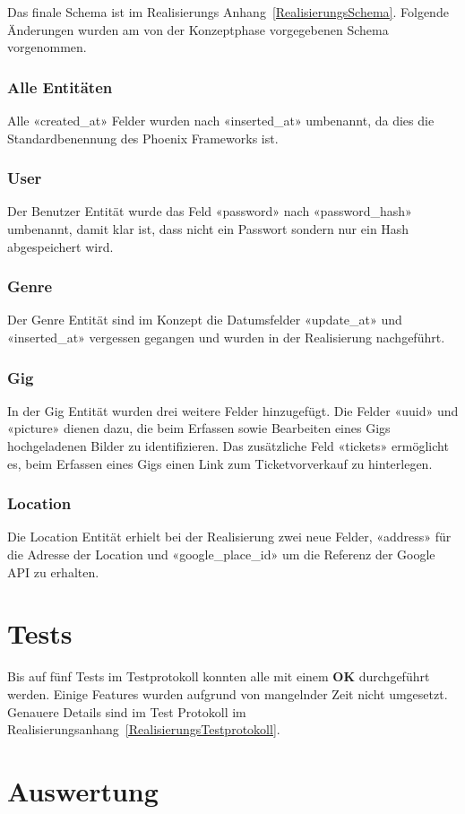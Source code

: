 Das finale Schema ist im Realisierungs Anhang~\ref{RealisierungsSchema}.
Folgende Änderungen wurden am von der Konzeptphase vorgegebenen Schema vorgenommen.

\subsubsection{Alle Entitäten}
Alle «created\_at» Felder wurden nach «inserted\_at» umbenannt, da dies die
Standardbenennung des Phoenix Frameworks ist.

\subsubsection{User}
Der Benutzer Entität wurde das Feld «password» nach «password\_hash» umbenannt,
damit klar ist, dass nicht ein Passwort sondern nur ein Hash abgespeichert wird.

\subsubsection{Genre}
Der Genre Entität sind im Konzept die Datumsfelder «update\_at» und «inserted\_at»
vergessen gegangen und wurden in der Realisierung nachgeführt.

\subsubsection{Gig}\label{RealisierungSchemaGig}
In der Gig Entität wurden drei weitere Felder hinzugefügt.
Die Felder «uuid» und «picture» dienen dazu, die beim Erfassen sowie
Bearbeiten eines Gigs hochgeladenen Bilder zu identifizieren.
Das zusätzliche Feld «tickets» ermöglicht es, beim Erfassen eines Gigs
einen Link zum Ticketvorverkauf zu hinterlegen.

\subsubsection{Location}
Die Location Entität erhielt bei der Realisierung zwei neue Felder,
«address» für die Adresse der Location und
«google\_place\_id» um die Referenz der Google API zu erhalten.

\section{Tests}

Bis auf fünf Tests im Testprotokoll konnten alle mit einem \textbf{OK}
durchgeführt werden. Einige Features wurden aufgrund von mangelnder Zeit nicht
umgesetzt. Genauere Details sind im Test Protokoll im
Realisierungsanhang~\ref{RealisierungsTestprotokoll}.

\section{Auswertung}
